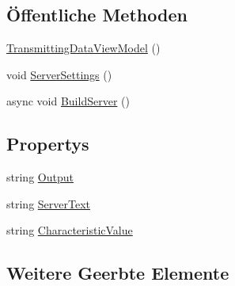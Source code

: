 \subsection*{Öffentliche Methoden}
\begin{DoxyCompactItemize}
\item 
\mbox{\hyperlink{classmy_m_d_1_1_view_model_1_1_send_data_tab_view_model_1_1_transmitting_data_view_model_a010f4e5a18f39b8df0e14fe18c13c1a3}{Transmitting\+Data\+View\+Model}} ()
\item 
void \mbox{\hyperlink{classmy_m_d_1_1_view_model_1_1_send_data_tab_view_model_1_1_transmitting_data_view_model_afed618540c221f2ff1c694562ca13e6b}{Server\+Settings}} ()
\item 
async void \mbox{\hyperlink{classmy_m_d_1_1_view_model_1_1_send_data_tab_view_model_1_1_transmitting_data_view_model_a9cf8af0162866af5ef75828b8fc7fac7}{Build\+Server}} ()
\end{DoxyCompactItemize}
\subsection*{Propertys}
\begin{DoxyCompactItemize}
\item 
string \mbox{\hyperlink{classmy_m_d_1_1_view_model_1_1_send_data_tab_view_model_1_1_transmitting_data_view_model_abac4636fdab3bde5b4f2a0c4e1e25811}{Output}}
\item 
string \mbox{\hyperlink{classmy_m_d_1_1_view_model_1_1_send_data_tab_view_model_1_1_transmitting_data_view_model_af1a42f300aeebfb80d4cce14dcc76c8b}{Server\+Text}}
\item 
string \mbox{\hyperlink{classmy_m_d_1_1_view_model_1_1_send_data_tab_view_model_1_1_transmitting_data_view_model_a7d651be602b1354dbaaf975773269bf7}{Characteristic\+Value}}
\end{DoxyCompactItemize}
\subsection*{Weitere Geerbte Elemente}


